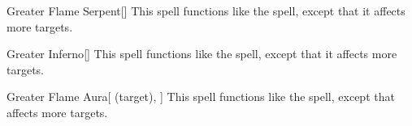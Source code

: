 \lowercase{\hypertarget{spell:Greater Flame Serpent}{}}\label{spell:Greater Flame Serpent}
\begin{freeability}[\nth{5}]{\hypertarget{spell:Greater Flame Serpent}{Greater Flame Serpent}}[]
This spell functions like the  spell, except that it affects more targets.
\end{freeability}
\vspace{0.25em}



\lowercase{\hypertarget{spell:Greater Inferno}{}}\label{spell:Greater Inferno}
\begin{freeability}[\nth{5}]{\hypertarget{spell:Greater Inferno}{Greater Inferno}}[]
This spell functions like the  spell, except that it affects more targets.
\end{freeability}
\vspace{0.25em}



\lowercase{\hypertarget{spell:Greater Flame Aura}{}}\label{spell:Greater Flame Aura}
\begin{attuneability}[\nth{6}]{\hypertarget{spell:Greater Flame Aura}{Greater Flame Aura}}[ (target), ]
This spell functions like the  spell, except that affects more targets.
\end{attuneability}
\vspace{0.25em}


